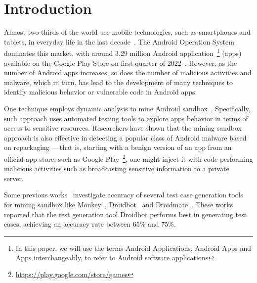 \section{Introduction}\label{sec:introduction}

Almost two-thirds of the world use mobile technologies, such as smartphones and tablets, in everyday life in the last decade~\cite{Comscore,DBLP:journals/tse/MartinSJZH17}. 
The Android Operation System dominates this market, with around 3.29 
million Android application~\footnote{In this paper, we will use the terms Android Applications, Android Apps and Apps interchangeably, to refer to Android software applications} (apps) available on the Google Play Store on first quarter of 2022~\cite{Statista}. 
However, as the number of Android apps increases, so does the number of malicious activities and 
malware, which in turn, has lead to the development of many techniques
to identify malicious behavior or vulnerable code in Android apps.

%
One technique employs dynamic analysis to mine Android sandbox~\cite{DBLP:conf/icse/JamrozikSZ16}. Specifically, such approach uses automated testing tools 
to explore apps behavior in terms of access to sensitive resources. Researchers have shown that the mining sandbox approach is also effective in detecting a popular class of Android malware based on repackaging~\cite{DBLP:conf/wcre/BaoLL18,le2018towards}---that is, starting with a benign version of an app from an official app store, such as Google Play~\footnote{\url{https://play.google.com/store/games}}, one might inject it with code performing malicious activities such as broadcasting sensitive information to a private server.~\cite{DBLP:journals/tse/LiBK21} %


Some previous works~\cite{DBLP:conf/wcre/BaoLL18,DBLP:journals/jss/CostaMMSSBNR22} investigate accuracy of several test case generation tools for mining sandbox like Monkey~\cite{Monkey}, Droidbot~\cite{DBLP:conf/icse/LiYGC17} and Droidmate~\cite{DBLP:conf/kbse/BorgesHZ18}. These works reported that the test generation tool Droidbot performs best in generating test cases, achieving an accuracy rate between 65\% and 75\%. 

